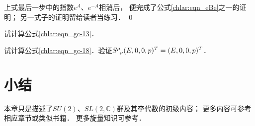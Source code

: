 上式最后一步中的指数$e^A$、$e^{-A}$相消后，
便完成了公式\eqref{chlar:eqn_eBe}之一的证明；
另一式子的证明留给读者当练习．
\qed







\begin{exercise}
	试计算公式\eqref{chlar:eqn_gc-13}．
\end{exercise}

\begin{exercise}
	试计算公式\eqref{chlar:eqn_gc-18}．验证$S^\mu_{\hphantom{\mu}\nu} (E,0,0,p)^T=(E,0,0,p)^T$．
\end{exercise}







\section*{小结}


本章只是描述了$SU(2)$、$SL(2,\mathbb{C})$群及其李代数的初级内容；
更多内容可参考\parencite{carmeli-rl1976,taorb-2011-gt}相应章节或类似书籍．  
更多旋量知识可参考\parencite{penrose-Rindler1984}．


\printbibliography[heading=subbibliography,title=第\ref{chlar}章参考文献]

\endinput













